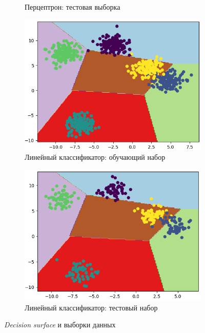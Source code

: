 \begin{figure}[h]
\begin{subfigure}{0.49\linewidth}
		\caption{Перцептрон: тестовая выборка}
	\end{subfigure}
	\begin{subfigure}{0.49\linewidth}
		\includegraphics[width=\linewidth]{images/sgd_train_blobs}
		\caption{Линейный классификатор: обучающий набор}
	\end{subfigure}
	\begin{subfigure}{0.49\linewidth}
		\includegraphics[width=\linewidth]{images/sgd_test_blobs}
		\caption{Линейный классификатор: тестовый набор}
	\end{subfigure}

	\caption{\textit{Decision surface} и выборки данных}
	\label{img:blobs}
\end{figure}

